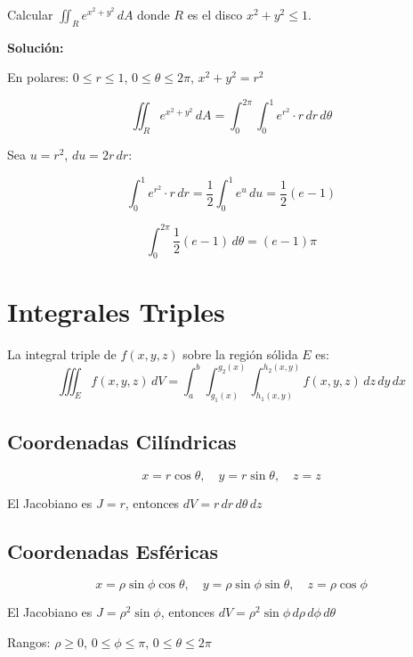 \documentclass[12pt, a4paper]{book}
\begin{document}
\begin{ejemplo}
Calcular $\iint_R e^{x^2+y^2} \, dA$ donde $R$ es el disco $x^2 + y^2 \leq 1$.

\textbf{Solución:}

En polares: $0 \leq r \leq 1$, $0 \leq \theta \leq 2\pi$, $x^2 + y^2 = r^2$

\[
\iint_R e^{x^2+y^2} \, dA = \int_0^{2\pi} \int_0^1 e^{r^2} \cdot r \, dr \, d\theta
\]

Sea $u = r^2$, $du = 2r \, dr$:

\[
\int_0^1 e^{r^2} \cdot r \, dr = \frac{1}{2}\int_0^1 e^u \, du = \frac{1}{2}(e - 1)
\]

\[
\int_0^{2\pi} \frac{1}{2}(e-1) \, d\theta = (e-1)\pi
\]
\end{ejemplo}

\section{Integrales Triples}

\begin{definicion}
La integral triple de $f(x,y,z)$ sobre la región sólida $E$ es:
\[
\iiint_E f(x,y,z) \, dV = \int_a^b \int_{g_1(x)}^{g_2(x)} \int_{h_1(x,y)}^{h_2(x,y)} f(x,y,z) \, dz \, dy \, dx
\]
\end{definicion}

\subsection{Coordenadas Cilíndricas}

\begin{transformacion}
\[
x = r\cos\theta, \quad y = r\sin\theta, \quad z = z
\]

El Jacobiano es $J = r$, entonces $dV = r \, dr \, d\theta \, dz$
\end{transformacion}

\subsection{Coordenadas Esféricas}

\begin{transformacion}
\[
x = \rho\sin\phi\cos\theta, \quad y = \rho\sin\phi\sin\theta, \quad z = \rho\cos\phi
\]

El Jacobiano es $J = \rho^2\sin\phi$, entonces $dV = \rho^2\sin\phi \, d\rho \, d\phi \, d\theta$

Rangos: $\rho \geq 0$, $0 \leq \phi \leq \pi$, $0 \leq \theta \leq 2\pi$
\end{transformacion}
\end{document}

